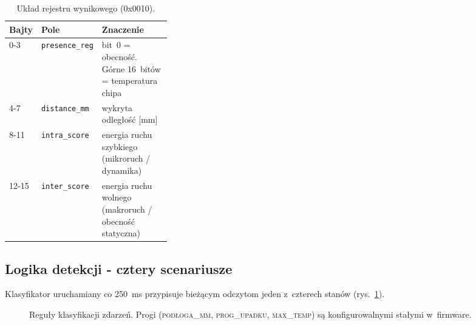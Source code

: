 \documentclass[11pt,a4paper]{article}
\begin{document}
\begin{table}[htbp]
\centering
\caption{Uk\l ad rejestru wynikowego (0x0010).}
\label{tab:rejestr}
\begin{tabularx}{\linewidth}{@{}P{0.09\linewidth} P{0.22\linewidth} L@{}}
\toprule
\textbf{Bajty} & \textbf{Pole} & \textbf{Znaczenie}\\
-3   & \texttt{presence\_reg} & bit~0 = obecno\'s\'c. G\'orne 16~bit\'ow = temperatura chipa\\
4-7   & \texttt{distance\_mm}  & wykryta odleg\l o\'s\'c [mm]\\
8-11  & \texttt{intra\_score}  & energia ruchu szybkiego (mikroruch / dynamika)\\
12-15 & \texttt{inter\_score}  & energia ruchu wolnego (makroruch / obecno\'s\'c statyczna)\\
\bottomrule
\end{tabularx}
\end{table}

\subsection{Logika detekcji - cztery scenariusze}

Klasyfikator uruchamiany co 250~ms przypisuje bie\.z\k acym odczytom jeden z~czterech
stan\'ow (rys.~\ref{fig:reguly}).

\begin{figure}[htbp]
\centering
{}
\caption{Regu\l y klasyfikacji zdarze\'n. Progi (\textsc{pod\l oga\_mm}, \textsc{prog\_upadku},
\textsc{max\_temp}) s\k a konfigurowalnymi sta\l ymi w~firmware.}
\label{fig:reguly}
\end{figure}
\end{document}
